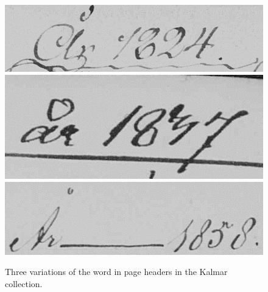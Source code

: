 
\begin{figure}
    \centering
    \includegraphics[scale=0.3]{resources/ar_kalmar/ar1824.png}
    \includegraphics[scale=0.3]{resources/ar_kalmar/ar1837.png}
    \includegraphics[scale=0.3]{resources/ar_kalmar/ar1858.png}
    \caption{Three variations of the word  in page headers in the Kalmar collection.}
    \label{fig:aar}
\end{figure}
